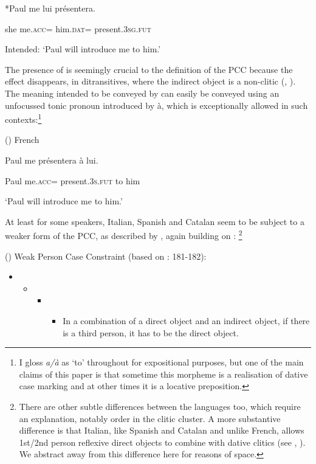 \documentclass[output=paper,modfonts,nonflat]{langsci/langscibook}
\begin{document}
  *Paul   me       lui       présentera.

  she   me.\textsc{acc}=   him.\textsc{dat=} present.\textsc{3sg.fut}

  Intended: ‘Paul will introduce me to him.’

The presence of  is seemingly crucial to the definition of the PCC because the effect disappears, in ditransitives, where the indirect object is a non-clitic (\citealt{Kayne1975}, \citealt{Rezac2008}). The meaning intended to be conveyed by  can easily be conveyed using an unfocussed tonic pronoun introduced by à, which is exceptionally allowed in such contexts:\footnote{I gloss \textit{a/à} as ‘to’ throughout for expositional purposes, but one of the main claims of this paper is that sometime this morpheme is a realisation of dative case marking and at other times it is a locative preposition.} 

()  French \citep[174]{Kayne1975}  

Paul   me     présentera     à   lui.

  Paul  me.\textsc{acc}=  present.\textsc{3s.fut}   to   him

  ‘Paul will introduce me to him.’

At least for some speakers, Italian, Spanish and Catalan seem to be subject to a weaker form of the PCC, as described by \citet{Bonet1991}, again building on \citet{Perlmutter1971}:\textstyleFootnoteSymbol{} \footnote{There are other subtle differences between the languages too, which require an explanation, notably order in the clitic cluster. A more substantive difference is that Italian, like Spanish and Catalan and unlike French, allows 1st/2nd person reflexive direct objects to combine with dative clitics (see \citealt{Kayne1975}, \citealt{Bianchi2006}). We abstract away from this difference here for reasons of space.}

()  Weak Person Case Constraint (based on \citealt{Bonet1991}: 181-182):  

\begin{itemize}
\item \begin{itemize}
\item \begin{itemize}
\item \begin{itemize}
\item \begin{styleListParagraph}
In a combination of a direct object and an indirect object, if there is a third person, it has to be the direct object.
\end{styleListParagraph}
\end{itemize}
\end{itemize}
\end{itemize}
\end{itemize}
\end{document}

